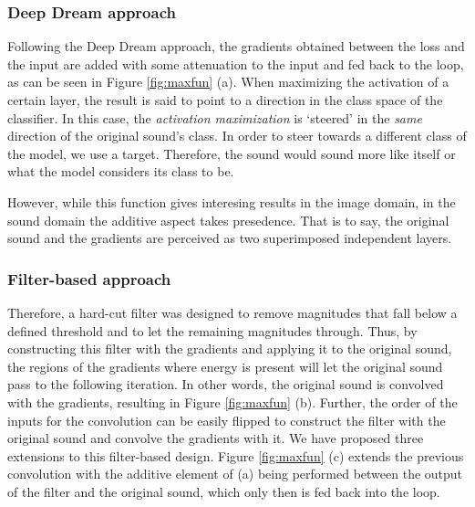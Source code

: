 \documentclass[a4paper,10pt,oneside]{article}
\begin{document}
\begin{sloppy}
\subsubsection{Deep Dream approach}
Following the Deep Dream approach, the gradients obtained between the loss and the input are added with some attenuation to the input and fed back to the loop, as can be seen in Figure \ref{fig:maxfun} (a). When maximizing the activation of a certain layer, the result is said to point to a direction in the class space of the classifier. In this case, the \textit{activation maximization} is `steered' in the \textit{same} direction of the original sound's class. In order to steer towards a different class of the model, we use a target. Therefore, the sound would sound more like itself or what the model considers its class to be. 

However, while this function gives interesing results in the image domain, in the sound domain the additive aspect takes presedence. That is to say, the original sound and the gradients are perceived as two superimposed independent layers.

\subsubsection{Filter-based approach}
Therefore, a hard-cut filter was designed to remove magnitudes that fall below a defined threshold and to let the remaining magnitudes through. Thus, by constructing this filter with the gradients and applying it to the original sound, the regions of the gradients where energy is present will let the original sound pass to the following iteration. In other words, the original sound is convolved with the gradients, resulting in Figure \ref{fig:maxfun} (b). Further, the order of the inputs for the convolution can be easily flipped to construct the filter with the original sound and convolve the gradients with it. We have proposed three extensions to this filter-based design. Figure \ref{fig:maxfun} (c) extends the previous convolution with the additive element of (a) being performed between the output of the filter and the original sound, which only then is fed back into the loop. 



\end{sloppy}
\end{document}
